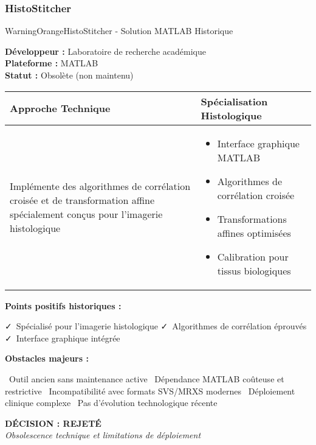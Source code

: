 \documentclass[11pt,a4paper]{report}
\newcommand{\pro}[1]{\textcolor{SuccessGreen}{\faCheck\ #1}}
\newcommand{\con}[1]{\textcolor{DangerRed}{\faTimes\ #1}}
\begin{document}
\subsubsection{HistoStitcher}

\begin{techbox}{WarningOrange}{HistoStitcher - Solution MATLAB Historique}

\textbf{Développeur :} Laboratoire de recherche académique \\
\textbf{Plateforme :} MATLAB \\
\textbf{Statut :} Obsolète (non maintenu)

\vspace{0.5cm}

\begin{tabularx}{\textwidth}{|X|X|}
\hline
\rowcolor{LightGray}
\textbf{Approche Technique} & \textbf{Spécialisation Histologique} \\
\hline
Implémente des algorithmes de corrélation croisée et de transformation affine spécialement conçus pour l'imagerie histologique &
\begin{itemize}[nosep]
\item Interface graphique MATLAB
\item Algorithmes de corrélation croisée
\item Transformations affines optimisées
\item Calibration pour tissus biologiques
\end{itemize} \\
\hline
\end{tabularx}

\vspace{0.5cm}

\textbf{Points positifs historiques :}
\begin{itemize}[leftmargin=*]
    \pro{Spécialisé pour l'imagerie histologique}
    \pro{Algorithmes de corrélation éprouvés}
    \pro{Interface graphique intégrée}
\end{itemize}

\textbf{Obstacles majeurs :}
\begin{itemize}[leftmargin=*]
    \con{Outil ancien sans maintenance active}
    \con{Dépendance MATLAB coûteuse et restrictive}
    \con{Incompatibilité avec formats SVS/MRXS modernes}
    \con{Déploiement clinique complexe}
    \con{Pas d'évolution technologique récente}
\end{itemize}

\begin{center}
\textbf{\textcolor{DangerRed}{DÉCISION : REJETÉ}}\\
\textit{Obsolescence technique et limitations de déploiement}
\end{center}

\end{techbox}
\end{document}
